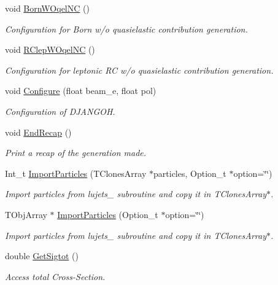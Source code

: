 \begin{DoxyCompactItemize}
void \hyperlink{class_t_djangoh_acbf402e049af75c65f28589178eb1487}{Born\+W\+Oqel\+NC} ()
\begin{DoxyCompactList}\small\item\em Configuration for Born w/o quasielastic contribution generation. \end{DoxyCompactList}\item 
void \hyperlink{class_t_djangoh_a283b09ffc625a6a14af2f301ae957c92}{R\+Clep\+W\+Oqel\+NC} ()
\begin{DoxyCompactList}\small\item\em Configuration for leptonic RC w/o quasielastic contribution generation. \end{DoxyCompactList}\item 
void \hyperlink{class_t_djangoh_af58a4c6bb944a4ce79cc538829e490e8}{Configure} (float beam\+\_\+e, float pol)
\begin{DoxyCompactList}\small\item\em Configuration of D\+J\+A\+N\+G\+OH. \end{DoxyCompactList}\item 
void \hyperlink{class_t_djangoh_a076cac82063ed8740ac0a32e77c02c94}{End\+Recap} ()
\begin{DoxyCompactList}\small\item\em Print a recap of the generation made. \end{DoxyCompactList}\item 
Int\+\_\+t \hyperlink{class_t_djangoh_a69e5ebe63faa2dd00d9bcd217ecdf825}{Import\+Particles} (T\+Clones\+Array $\ast$particles, Option\+\_\+t $\ast$option=\char`\"{}\char`\"{})
\begin{DoxyCompactList}\small\item\em Import particles from lujets\+\_\+ subroutine and copy it in T\+Clones\+Array$\ast$. \end{DoxyCompactList}\item 
T\+Obj\+Array $\ast$ \hyperlink{class_t_djangoh_ac63f2c463b6a2fff98f256952aaf945f}{Import\+Particles} (Option\+\_\+t $\ast$option=\char`\"{}\char`\"{})
\begin{DoxyCompactList}\small\item\em Import particles from lujets\+\_\+ subroutine and copy it in T\+Clones\+Array$\ast$. \end{DoxyCompactList}\item 
double \hyperlink{class_t_djangoh_a6c3ac520ed9c8c8eb0e80f3dda7eb146}{Get\+Sigtot} ()
\begin{DoxyCompactList}\small\item\em Access total Cross-\/\+Section. \end{DoxyCompactList}\item 

\end{DoxyCompactItemize}
